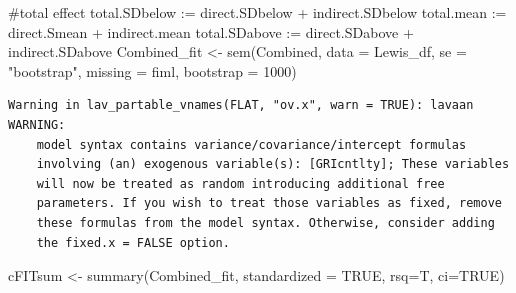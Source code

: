 \documentclass[
]{book}
\newenvironment{Shaded}{\begin{snugshade}}{\end{snugshade}}
\newcommand{\AttributeTok}[1]{\textcolor[rgb]{0.77,0.63,0.00}{#1}}
\newcommand{\ConstantTok}[1]{\textcolor[rgb]{0.00,0.00,0.00}{#1}}
\newcommand{\DecValTok}[1]{\textcolor[rgb]{0.00,0.00,0.81}{#1}}
\newcommand{\FunctionTok}[1]{\textcolor[rgb]{0.00,0.00,0.00}{#1}}
\newcommand{\NormalTok}[1]{#1}
\newcommand{\OtherTok}[1]{\textcolor[rgb]{0.56,0.35,0.01}{#1}}
\newcommand{\StringTok}[1]{\textcolor[rgb]{0.31,0.60,0.02}{#1}}
\begin{document}
\begin{Shaded}
\begin{Highlighting}[]
\StringTok{    \#total effect}
\StringTok{    total.SDbelow := direct.SDbelow + indirect.SDbelow}
\StringTok{    total.mean := direct.Smean + indirect.mean}
\StringTok{    total.SDabove := direct.SDabove + indirect.SDabove}
\StringTok{ \textquotesingle{}}
\NormalTok{Combined\_fit }\OtherTok{\textless{}{-}} \FunctionTok{sem}\NormalTok{(Combined, }\AttributeTok{data =}\NormalTok{ Lewis\_df, }\AttributeTok{se =} \StringTok{"bootstrap"}\NormalTok{, }\AttributeTok{missing =} \StringTok{\textquotesingle{}fiml\textquotesingle{}}\NormalTok{, }\AttributeTok{bootstrap =} \DecValTok{1000}\NormalTok{)}
\end{Highlighting}
\end{Shaded}

\begin{verbatim}
Warning in lav_partable_vnames(FLAT, "ov.x", warn = TRUE): lavaan WARNING:
    model syntax contains variance/covariance/intercept formulas
    involving (an) exogenous variable(s): [GRIcntlty]; These variables
    will now be treated as random introducing additional free
    parameters. If you wish to treat those variables as fixed, remove
    these formulas from the model syntax. Otherwise, consider adding
    the fixed.x = FALSE option.
\end{verbatim}

\begin{Shaded}
\begin{Highlighting}[]
\NormalTok{cFITsum }\OtherTok{\textless{}{-}} \FunctionTok{summary}\NormalTok{(Combined\_fit, }\AttributeTok{standardized =} \ConstantTok{TRUE}\NormalTok{, }\AttributeTok{rsq=}\NormalTok{T, }\AttributeTok{ci=}\ConstantTok{TRUE}\NormalTok{)    }
\end{Highlighting}
\end{Shaded}
\end{document}
